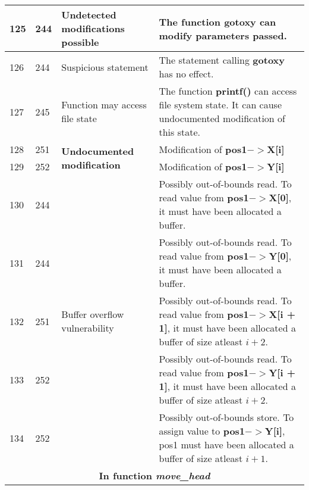 \documentclass[]{article}
\begin{document}
\begin{longtable}{ |p{0.5cm}|p{0.75cm}|p{3cm}|p{9cm}|  }
		125 & 244 & Undetected modifications possible & The function \textbf{gotoxy} can modify parameters passed. \\
		\hline 
		126 & 244 & Suspicious statement & The statement calling \textbf{gotoxy} has no effect. \\
		\hline 
		127 & 245 & Function may access file state & The function \textbf{printf()} can access file system state. It can cause undocumented modification of this state. \\
		\hline 
		128 & 251 & \multirow{2}{90.0pt}{\textbf{Undocumented modification}} & Modification of \textbf{pos1$->$X[i]} \\
		129 & 252 & & Modification of \textbf{pos1$->$Y[i]} \\
		\hline 
		130 & 244 & \multirow{5}{60.0pt}{Buffer overflow vulnerability} & Possibly out-of-bounds read. To read value from \textbf{pos1$->$X[0]}, it must have been allocated a buffer.  \\
		131 & 244 & & Possibly out-of-bounds read. To read value from \textbf{pos1$->$Y[0]}, it must have been allocated a buffer.  \\
		132 & 251 & & Possibly out-of-bounds read. To read value from \textbf{pos1$->$X[i + 1]}, it must have been allocated a buffer of size atleast $i + 2$.  \\
		133 & 252 & & Possibly out-of-bounds read. To read value from \textbf{pos1$->$Y[i + 1]}, it must have been allocated a buffer of size atleast $i + 2$.  \\
		134 & 252 & & Possibly out-of-bounds store. To assign value to \textbf{pos1$->$Y[i]}, pos1 must have been allocated a buffer of size atleast $i + 1$.  \\
		
		
		\hline 
		\multicolumn{4}{|c|}{\textbf{In function \textit{move\_head}}} \\
		\hline 
		

\end{longtable}
\end{document}
